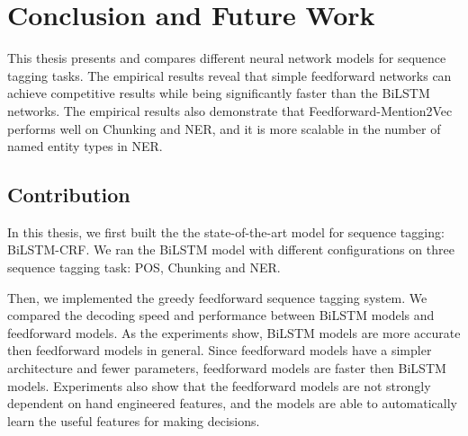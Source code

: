 \documentclass{sfuthesis}
\begin{document}
\tableofcontents\clearpage
{}\listoftables\clearpage
{}\listoffigures





%
%

\mainmatter%











\chapter{Conclusion and Future Work}

This thesis presents and compares different neural network models for sequence tagging tasks. The empirical results reveal that simple feedforward networks can achieve competitive results while being significantly faster than the BiLSTM networks. The empirical results also demonstrate that Feedforward-Mention2Vec performs well on Chunking and NER, and it is more scalable in the number of named entity types in NER.

\section{Contribution}
In this thesis, we first built the the state-of-the-art model for sequence tagging: BiLSTM-CRF. We ran the BiLSTM model with different configurations on three sequence tagging task: POS, Chunking and NER. 

Then, we implemented the greedy feedforward sequence tagging system. We compared the decoding speed and performance between BiLSTM models and feedforward models. As the experiments show, BiLSTM models are more accurate then feedforward models in general. Since feedforward models have a simpler architecture and fewer parameters, feedforward models are faster then BiLSTM models. Experiments also show that the feedforward models are not strongly dependent on hand engineered features, and the models are able to automatically learn the useful features for making decisions.
\end{document}
